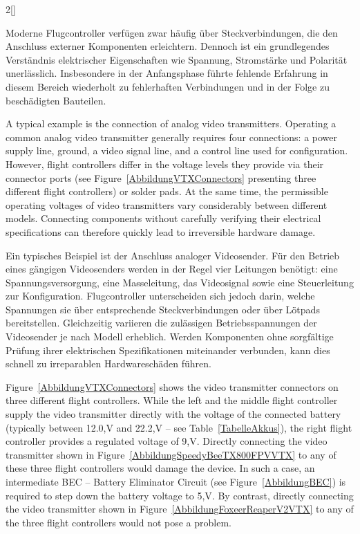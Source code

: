 \begin{paracol}{2}[]
\colger

Moderne Flugcontroller verfügen zwar häufig über Steckverbindungen, die den Anschluss externer Komponenten erleichtern. Dennoch ist ein grundlegendes Verständnis elektrischer Eigenschaften wie Spannung, Stromstärke und Polarität unerlässlich. Insbesondere in der Anfangsphase führte fehlende Erfahrung in diesem Bereich wiederholt zu fehlerhaften Verbindungen und in der Folge zu beschädigten Bauteilen.

\coleng

A typical example is the connection of analog video transmitters. Operating a common analog video transmitter generally requires four connections: a power supply line, ground, a video signal line, and a control line used for configuration. However, flight controllers differ in the voltage levels they provide via their connector ports (see Figure~\ref{AbbildungVTXConnectors} presenting three different flight controllers) or solder pads. At the same time, the permissible operating voltages of video transmitters vary considerably between different models. Connecting components without carefully verifying their electrical specifications can therefore quickly lead to irreversible hardware damage.

\colger

Ein typisches Beispiel ist der Anschluss analoger Videosender. Für den Betrieb eines gängigen Videosenders werden in der Regel vier Leitungen benötigt: eine Spannungsversorgung, eine Masseleitung, das Videosignal sowie eine Steuerleitung zur Konfiguration. Flugcontroller unterscheiden sich jedoch darin, welche Spannungen sie über entsprechende Steckverbindungen oder über Lötpads bereitstellen. Gleichzeitig variieren die zulässigen Betriebsspannungen der Videosender je nach Modell erheblich. Werden Komponenten ohne sorgfältige Prüfung ihrer elektrischen Spezifikationen miteinander verbunden, kann dies schnell zu irreparablen Hardwareschäden führen.

\coleng

Figure~\ref{AbbildungVTXConnectors} shows the video transmitter connectors on three different flight controllers. While the left and the middle flight controller supply the video transmitter directly with the voltage of the connected battery (typically between 12.0,V and 22.2,V -- see Table~\ref{TabelleAkkus}), the right flight controller provides a regulated voltage of 9,V. Directly connecting the video transmitter shown in Figure~\ref{AbbildungSpeedyBeeTX800FPVVTX} to any of these three flight controllers would damage the device. In such a case, an intermediate BEC -- Battery Eliminator Circuit (see Figure~\ref{AbbildungBEC}) is required to step down the battery voltage to 5,V. By contrast, directly connecting the video transmitter shown in Figure~\ref{AbbildungFoxeerReaperV2VTX} to any of the three flight controllers would not pose a problem.


\end{paracol}
